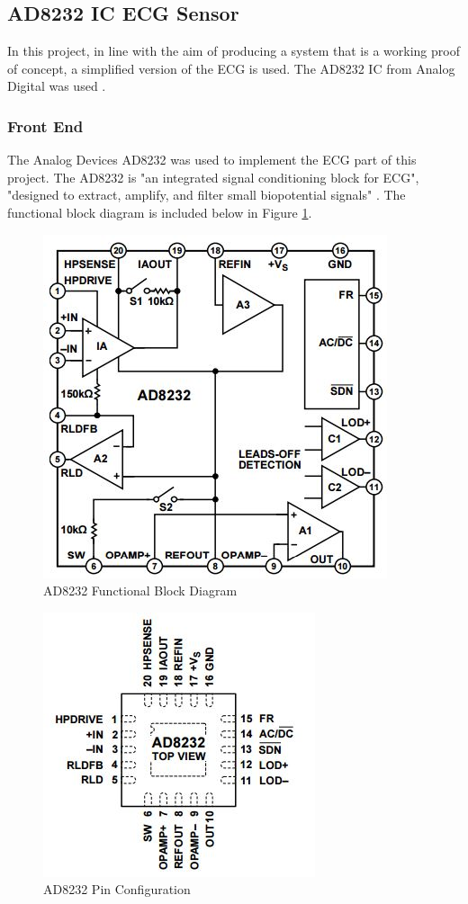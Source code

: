 \subsection{AD8232 IC ECG Sensor}

In this project, in line with the aim of producing a system that is a working proof of concept, a simplified version of the ECG is used. The AD8232 IC from Analog Digital was used \cite{ad8232datasheet}. 

\subsubsection{Front End}

The Analog Devices AD8232 was used to implement the ECG part of this project. The AD8232 is "an integrated signal conditioning block for ECG", "designed to extract, amplify, and filter small biopotential signals" \cite{ad8232datasheet}. The functional block diagram is included below in Figure \ref{ad8232functional}. 

\begin{figure}[H]
	\centering
	\includegraphics[width=0.5\linewidth]{ad8232funcdiagram.jpg}
	\caption{AD8232 Functional Block Diagram \cite{ad8232datasheet}}
	\label{ad8232functional}
\end{figure}

\begin{figure}[H]
	\centering
	\includegraphics[width=0.4\linewidth]{ad8232pin.jpg}
	\caption{AD8232 Pin Configuration \cite{ad8232datasheet}}
	\label{ad8232pin}
\end{figure}

